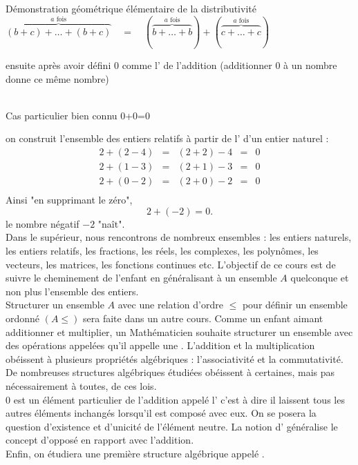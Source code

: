 \documentclass{book}
\begin{document}
\begin{Texte}
\begin{itemize}
\begin{center}
\begin{tikzpicture}
\end{tikzpicture}\\
Démonstration géométrique élémentaire de la distributivité  $\overbrace{(b+c)+\dots+(b+c)}^{a \text{ fois}}\quad=\quad  ( \overbrace{b+\dots+b}^{a \text{ fois}})+(\overbrace{c+\dots+c}^{a \text{ fois}})$
\end{center}
 \end{itemize}
ensuite après avoir défini $0$ comme l' de l'addition (additionner $0$ à un nombre donne ce même nombre) 
\begin{center}
 \\
Cas particulier bien connu 0+0=0
\end{center}
  on construit l'ensemble des entiers relatifs à partir de l' d'un entier naturel :
$$\begin{aligned}
2+(2-4)&=&(2+2)-4&=&0\\
2+(1-3)&=&(2+1)-3&=&0\\
2+(0-2)&=&(2+0)-2&=&0\\
\end{aligned}$$
Ainsi "en supprimant le zéro", 
$$2+(-2)=0.$$
le nombre négatif $-2$ "naît".\\ 
Dans le supérieur, nous rencontrons de nombreux ensembles : les entiers naturels, les entiers relatifs, les fractions, les réels, les complexes, les polynômes, les vecteurs, les matrices, les fonctions continues etc. L'objectif de ce cours est de suivre le cheminement de l'enfant en généralisant à un ensemble  $A$  quelconque et non plus l'ensemble des entiers.\\
Structurer un ensemble $A$ avec une relation d'ordre $\leq$ pour définir un ensemble ordonné $(A\leq)$ sera faite dans un autre cours.  Comme un enfant aimant additionner et multiplier, un Mathématicien souhaite structurer un ensemble avec des opérations appelées  qu'il appelle une . L'addition et la multiplication  obéissent à plusieurs propriétés algébriques : l'associativité et la commutativité. De nombreuses structures algébriques étudiées obéissent à certaines, mais pas nécessairement à toutes, de ces lois. \\
$0$ est un élément particulier de l'addition appelé l' c'est à dire il laissent tous les autres éléments inchangés lorsqu'il est composé avec eux. On se posera la question d'existence et d'unicité de l'élément neutre. La notion d' généralise le concept d'opposé en rapport avec l'addition.\\
Enfin, on étudiera une première structure algébrique appelé .    
\end{Texte}
\end{document}
